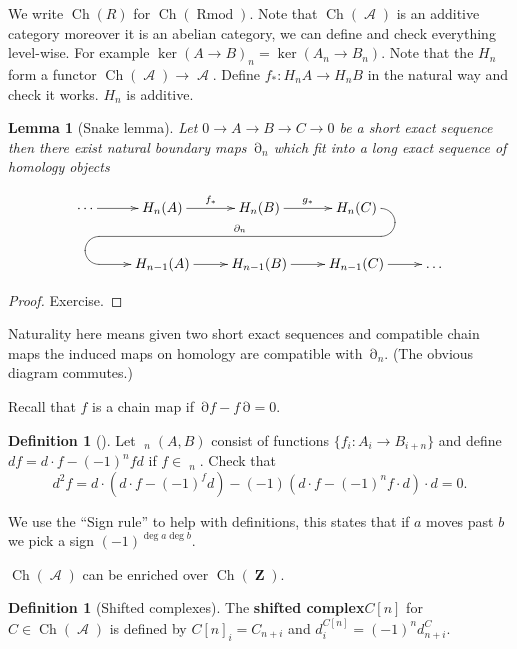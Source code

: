 \documentclass[10pt,]{book}
\newcommand{\terminology}[1]{\textbf{#1}}
\theoremstyle{plain}
\newtheorem{lemma}[theorem]{Lemma}
\theoremstyle{definition}
\newtheorem{definition}[theorem]{Definition}
\numberwithin{equation}{section}
\renewenvironment{figure}%
{\begin{mbxfigure}\setcounter{mbxfigure}{\value{theorem}}\stepcounter{theorem}}%
{\end{mbxfigure}}
\DeclareMathOperator{\cHom}{\underline{Hom}}
\DeclareMathOperator{\Ch}{Ch}
\DeclareMathOperator{\Rmod}{R\text{mod}}
\DeclareMathOperator{\cA}{\mathcal{A}}
\DeclareMathOperator{\dd}{\partial}
\DeclareMathOperator{\ZZ}{\mathbf{Z}}
\begin{document}
          We write \(\Ch(R)\) for \(\Ch(\Rmod)\).
          Note that \(\Ch(\cA)\) is an additive category moreover it is an abelian category, we can define and check everything level-wise.
          For example \(\ker(A\to B)_n = \ker(A_n\to B_n)\).
          Note that the \(H_n\) form a functor \(\Ch(\cA)\to \cA\).
          Define \(f_*\colon H_n A \to H_n B\) in the natural way and check it works.
          \(H_n\) is additive.
\begin{lemma}[Snake lemma]\label{lemma-snake}
Let \(0\to A \to B \to C \to 0\) be a short exact sequence then there exist natural boundary maps \(\dd_n\) which fit into a long exact sequence of homology objects
            \begin{figure}
\centering
\[
                \xymatrix{ \cdots\ar[r] & H_n(A) \ar[r]^{f_*}&
                H_n(B) \ar[r]^{g_*} & H_n(C)\ar `r[d] `[l]
                `[llld]_{\dd_n} `[dll] [dll]\\
                & H_{n-1}(A) \ar[r] & H_{n-1}(B)
                \ar[r] & H_{n-1}(C)\ar[r] & {\dots} }
              \]\end{figure}
\end{lemma}
\begin{proof}
Exercise.\end{proof}
\par
Naturality here means given two short exact sequences and compatible chain maps the induced maps on homology are compatible with \(\dd_n\).
          (The obvious diagram commutes.)
\par
Recall that \(f\) is a chain map if \(\dd f - f\dd = 0\).%
\begin{definition}[]\label{definition-10}
Let \(\cHom_n(A,B)\) consist of functions \(\{f_i \colon A_i \to B_{i+n}\} \) and define \(df = d\cdot f - (-1)^n fd\) if \(f\in\cHom_n\).
            Check that \[d^2 f = d\cdot (d\cdot f - (-1)^fd ) - (-1) (d\cdot f - (-1)^n f\cdot d)\cdot d = 0.\]\end{definition}
\par
We use the ``Sign rule'' to help with definitions, this states that if \(a\) moves past \(b\) we pick a sign \((-1)^{\deg a\deg b}\).%
\par
\(\Ch(\cA)\) can be enriched over \(\Ch(\ZZ)\).%
\begin{definition}[Shifted complexes]\label{definition-11}
The \terminology{shifted complex}\(C[n]\) for \(C\in \Ch(\cA)\) is defined by \(C[n]_i = C_{n+i}\) and \(d_i^{C[n]} = (-1)^n d_{n+i}^C\).\end{definition}
\end{document}
